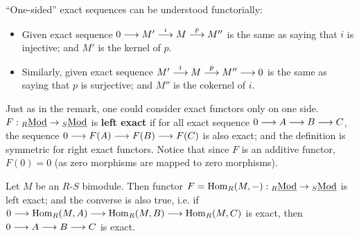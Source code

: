 \begin{remark}
    ``One-sided'' exact sequences can be understood functorially:
    \begin{itemize}
        \item Given exact sequence $0 \longrightarrow M' \overset{i}{\longrightarrow} M \overset{p}{\longrightarrow} M''$ is the same as saying that $i$ is injective; and $M'$ is the kernel of $p$.
        \item Similarly, given exact sequence $M' \overset{i}{\longrightarrow} M \overset{p}{\longrightarrow} M'' \longrightarrow 0$ is the same as saying that $p$ is surjective; and $M''$ is the cokernel of $i$.
    \end{itemize}
\end{remark}

\begin{definition}
    Just as in the remark, one could consider exact functors only on one side. $F: {}_{R}\underline{\textup{Mod}} \to {}_{S}\underline{\textup{Mod}}$ is \textbf{left exact} if for all exact sequence $0 \longrightarrow A \longrightarrow B \longrightarrow C$, the sequence $0 \longrightarrow F(A) \longrightarrow F(B) \longrightarrow F(C)$ is also exact; and the definition is symmetric for right exact functors. Notice that since $F$ is an additive functor, $F(0) = 0$ (as zero morphisms are mapped to zero morphisms). 
\end{definition}

\begin{proposition}\label{prop:Hom(M,-) left exact}
    Let $M$ be an $R$-$S$ bimodule. Then functor $F = \mathrm{Hom}_R(M, -): {}_{R}\underline{\textup{Mod}} \to {}_{S}\underline{\textup{Mod}}$ is left exact; and the converse is also true, i.e. if $0 \longrightarrow \mathrm{Hom}_R(M, A) \longrightarrow \mathrm{Hom}_R(M, B) \longrightarrow \mathrm{Hom}_R(M, C)$ is exact, then $0 \longrightarrow A \longrightarrow B \longrightarrow C$ is exact.
\end{proposition}

